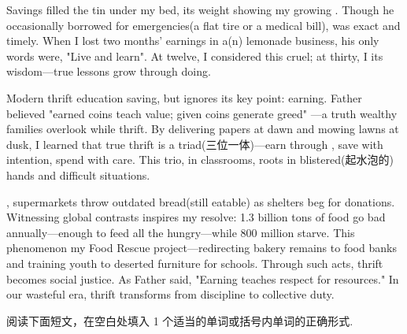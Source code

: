 \documentclass{英语试卷}
\begin{document}
\par Savings filled the tin under my bed, its weight showing my growing . Though he occasionally borrowed for emergencies(a flat tire or a medical bill),  was exact and timely. When I lost two months' earnings in a(n)  lemonade business, his only words were, "Live and learn". At twelve, I considered this cruel; at thirty, I  its wisdom—true lessons grow through doing.\par
\par Modern thrift education  saving, but ignores its key point: earning. Father believed "earned coins teach value; given coins generate greed" —a truth wealthy families overlook while  thrift. By delivering papers at dawn and mowing lawns at dusk, I learned that true thrift is a triad(三位一体)—earn through , save with intention, spend with care. This trio,  in classrooms, roots in blistered(起水泡的) hands and difficult situations.\par
\par {}, supermarkets throw outdated bread(still eatable) as shelters beg for donations. Witnessing global contrasts inspires my resolve: 1.3 billion tons of food go bad annually—enough to feed all the hungry—while 800 million starve. This phenomenon  my Food Rescue project—redirecting bakery remains to food banks and training youth to  deserted furniture for schools. Through such acts, thrift becomes social justice. As Father said, "Earning teaches respect for resources." In our wasteful era, thrift transforms from  discipline to collective duty.\par
{}
\par 阅读下面短文，在空白处填入 1 个适当的单词或括号内单词的正确形式.\par
\end{document}
